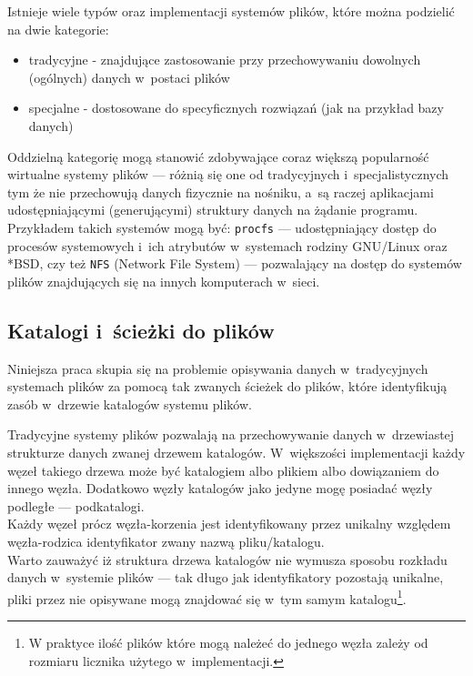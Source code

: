 \par
Istnieje wiele typów oraz implementacji systemów plików, które można podzielić na dwie kategorie:

\begin{itemize}
\item tradycyjne - znajdujące zastosowanie przy przechowywaniu dowolnych (ogólnych) danych w~postaci plików
\item specjalne - dostosowane do specyficznych rozwiązań (jak na przykład bazy danych)
\end{itemize}

Oddzielną kategorię mogą stanowić zdobywające coraz większą popularność wirtualne systemy plików --- różnią się one od tradycyjnych i~specjalistycznych tym że nie przechowują danych fizycznie na nośniku, a~są raczej aplikacjami udostępniającymi (generującymi) struktury danych na żądanie programu. Przykładem takich systemów mogą być: \texttt{procfs} --- udostępniający dostęp do procesów systemowych i~ich atrybutów w~systemach rodziny GNU/Linux oraz *BSD, czy też \texttt{NFS} (Network File System) --- pozwalający na dostęp do systemów plików znajdujących się na innych komputerach w~sieci.

\subsection{Katalogi i~ścieżki do plików}
\par
Niniejsza praca skupia się na problemie opisywania danych w~tradycyjnych systemach plików za pomocą tak zwanych ścieżek do plików, które identyfikują zasób w~drzewie katalogów systemu plików.

\par
Tradycyjne systemy plików pozwalają na przechowywanie danych w~drzewiastej strukturze danych zwanej drzewem katalogów. W~większości implementacji każdy węzeł takiego drzewa może być katalogiem albo plikiem albo dowiązaniem do innego węzła. Dodatkowo węzły katalogów jako jedyne mogę posiadać węzły podległe --- podkatalogi.\\
Każdy węzeł prócz węzła-korzenia jest identyfikowany przez unikalny względem węzła-rodzica identyfikator zwany nazwą pliku/katalogu.\\
Warto zauważyć iż struktura drzewa katalogów nie wymusza sposobu rozkładu danych w~systemie plików --- tak długo jak identyfikatory pozostają unikalne, pliki przez nie opisywane mogą znajdować się w~tym samym katalogu\footnote{W praktyce ilość plików które mogą należeć do jednego węzła zależy od rozmiaru licznika użytego w~implementacji.}.

